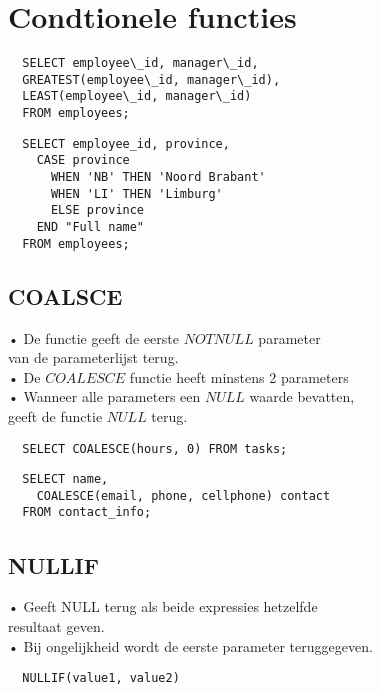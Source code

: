 \section{Condtionele functies}

\begin{tiny}
\begin{lstlisting}
  SELECT employee\_id, manager\_id,
  GREATEST(employee\_id, manager\_id),
  LEAST(employee\_id, manager\_id)
  FROM employees;
\end{lstlisting}

\begin{lstlisting}
  SELECT employee_id, province,
    CASE province
      WHEN 'NB' THEN 'Noord Brabant'
      WHEN 'LI' THEN 'Limburg'
      ELSE province
    END "Full name"
  FROM employees;
\end{lstlisting}
\end{tiny}

\subsection{COALSCE}
• De functie geeft de eerste $NOT NULL$ parameter\\
van de parameterlijst terug.\\
• De $COALESCE$ functie heeft minstens 2 parameters\\
• Wanneer alle parameters een $NULL$ waarde bevatten,\\
geeft de functie $NULL$ terug.\\

\begin{tiny}
\begin{lstlisting}
  SELECT COALESCE(hours, 0) FROM tasks;
\end{lstlisting}

\begin{lstlisting}
  SELECT name,
    COALESCE(email, phone, cellphone) contact
  FROM contact_info;
\end{lstlisting}
\end{tiny}

\subsection{NULLIF}
• Geeft NULL terug als beide expressies hetzelfde\\
resultaat geven.\\
• Bij ongelijkheid wordt de eerste parameter teruggegeven.

\begin{tiny}
\begin{lstlisting}
  NULLIF(value1, value2)
\end{lstlisting}
\end{tiny}